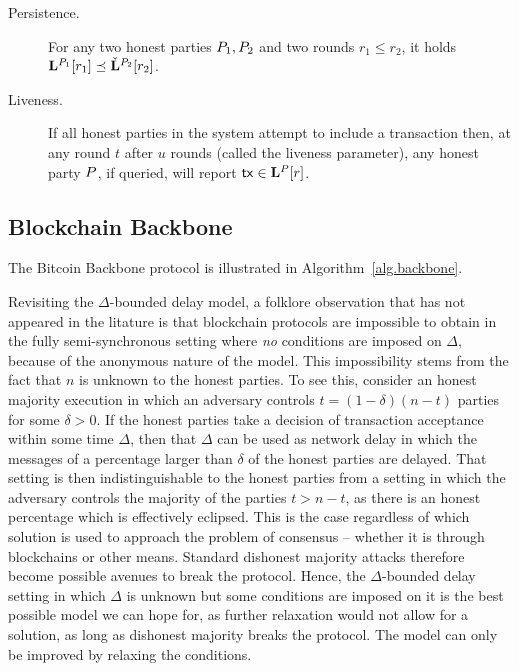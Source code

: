 \begin{definition}[Ledger]
\end{definition}

\begin{description}
  \item[Persistence.]
    For any two honest parties $P_1,P_2$ and two rounds $r_1\leq r_2$,
    it holds  $\mathbf{L}^{P_1}[r_1] \preceq
    \check{\mathbf{L}}^{P_2}[r_2]$.

  \item[Liveness.]
    If all honest parties in the system attempt to include a  transaction
    then, at any round $t$ after $u$ rounds (called the
    liveness parameter), any honest party $P$, if queried,
    will report $\mathsf{tx} \in \mathbf{L}^{P}[r]$.
\end{description}


\subsection{Blockchain Backbone}

\cite{backbone,pass-asynchronous,varbackbone}

The Bitcoin Backbone protocol is illustrated in Algorithm~\ref{alg.backbone}.



\begin{remark}
Revisiting the $\Delta$-bounded delay model, a folklore observation that has not appeared in
the litature is that blockchain protocols are impossible to obtain in the fully
semi-synchronous setting where \emph{no} conditions are imposed on $\Delta$,
because of the anonymous nature of the model. This impossibility stems from the
fact that $n$ is unknown to the honest parties. To see this, consider an
honest majority execution in which an adversary controls $t = (1 - \delta)(n -
t)$ parties for some $\delta > 0$. If the honest parties take a decision of
transaction acceptance within some time $\Delta$, then that $\Delta$ can be used
as network delay in which the messages of a percentage larger than $\delta$ of
the honest parties are delayed. That setting is then indistinguishable to the
honest parties from a setting in which the adversary controls the majority of
the parties $t > n - t$, as there is an honest percentage which is effectively
eclipsed. This is the case regardless of which solution is used to approach the
problem of consensus -- whether it is through blockchains or other means.
Standard dishonest majority attacks therefore become possible avenues to break
the protocol. Hence, the $\Delta$-bounded delay setting in which $\Delta$ is
unknown but some conditions are imposed on it is the best possible model we can
hope for, as further relaxation would not allow for a solution, as long as
dishonest majority breaks the protocol. The model can only be improved by
relaxing the conditions.
\end{remark}

